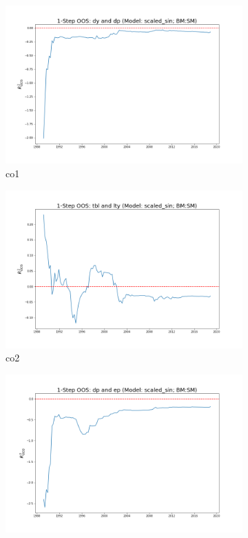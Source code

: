 \documentclass[a4paper,12pt,times,numbered,print,index]{report}
\numberwithin{equation}{section}
\begin{document}
	\begin{figure}[!htbp]
		\centering
		\caption{OOS Results for Model with $f_3$}
		\begin{subfigure}[b]{0.42\linewidth}
			\includegraphics[width=0.9\linewidth]{OOS_plots/scaled_sin_co1_SM.png}
			\caption{co1}
		\end{subfigure}
		\begin{subfigure}[b]{0.42\linewidth}
			\includegraphics[width=0.9\linewidth]{OOS_plots/scaled_sin_co2_SM.png}
			\caption{co2}
		\end{subfigure}
		\begin{subfigure}[b]{0.42\linewidth}
			\includegraphics[width=0.9\linewidth]{OOS_plots/scaled_sin_co3_SM.png}

\end{subfigure}
\end{figure}
\end{document}
